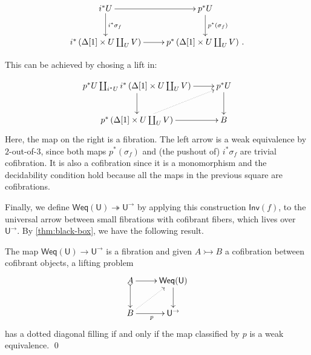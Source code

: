 \documentclass[reqno,10pt,a4paper,oneside]{amsart}
\makeatletter
\renewenvironment{proof}[1][\proofname] {\par\pushQED{\qed}\normalfont\topsep6\p@\@plus6\p@\relax\trivlist\item[\hskip\labelsep\bf#1\@addpunct{.}]\ignorespaces}{\popQED\endtrivlist\@endpefalse}
\numberwithin{equation}{section}
\theoremstyle{mythm}
\theoremstyle{mydef}
\theoremstyle{myrmk}
\newcommand{\co}{\colon}
\newcommand{\SSet}{\mathbf{SSet}}
\newcommand{\U}{\mathsf{U}}
\newcommand{\Weq}{\mathsf{Weq}}
\newcommand{\Iseq}{\mathsf{Inv}}
\makeatother
\begin{document}
\begin{proof}
\[
\xymatrix{
i^* U \ar[r] \ar[d]^{i^* \sigma_f} & p^* U   \ar[d]^{p^*(\sigma_f)} \\
i^*\left( \Delta[1] \times U \coprod_U V \right) \ar[r] & p^* \left( \Delta[1] \times U \coprod_U V \right) \, .
}
\]

This can be achieved by chosing a lift in:

\[
\xymatrix{  p^* U \coprod_{i^* U} i^*\left( \Delta[1] \times U \coprod_U V \right) \ar[r] \ar[d] & p^* U   \ar[d] \\
p^* \left( \Delta[1] \times U \coprod_U V \right) \ar[r] \ar@{.>}[ur] & B
}
\]
Here, the map on the right is a fibration. The left arrow is a weak equivalence by $2$-out-of-$3$, since both maps $p^*(\sigma_f)$ and (the pushout of) $i^* \sigma_f$ are trivial cofibration. It is also a cofibration since it is a monomorphism and the decidability condition hold because all the maps in the previous square are cofibrations.
\end{proof}



Finally, we define $\Weq(\U) \twoheadrightarrow \U^\to$ by applying this construction $\Iseq(f)$, to the universal arrow between small fibrations with cofibrant fibers, which lives over $\U^\to$. By \cref{thm:black-box}, we have the following result.

\begin{proposition} \label{prop:Weq_classify_Weq}
The map $\Weq(\U) \to \U^\to$ is a fibration and given $A \rightarrowtail B$ a cofibration between cofibrant objects, a lifting problem
\[
\xymatrix{ A \ar[r] \ar@{>->}[d] & \mathsf{Weq}(\U) \ar[d] \\
B \ar@{.>}[ur] \ar[r]_{p} & \U^\to
}
\]
has a dotted diagonal filling if and only if the map classified by $p$ is a weak equivalence. \qed
\end{proposition}





\end{document}
